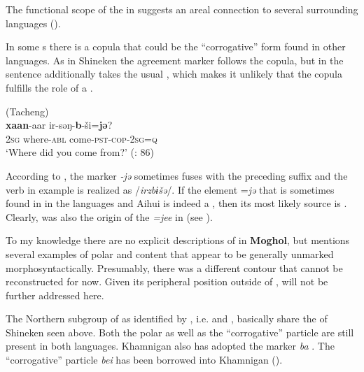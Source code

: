 \noindent The functional scope of the  in  suggests an areal connection to several surrounding languages ().

In some s there is a copula that could be the “corrogative” form found in other  languages. As in Shineken  the agreement marker follows the copula, but in  the sentence additionally takes the usual , which makes it unlikely that the copula fulfills the role of a .

\ea%
    \label{ex:mong:12}
     (Tacheng)\\
     \textbf{{xaan}}-aar  ir-səŋ-\textbf{{b}}{-ši=}\textbf{{jə}}?\\
    2\textsc{sg}  where-\textsc{abl}  come-\textsc{pst}-\textsc{cop}-2\textsc{sg=q}\\
    \glt ‘Where did you come from?’ (\citealt{Yu2008}: 86)
    \z

\noindent According to \citet[79]{Yu2008}, the marker \textit{-jə} sometimes fuses with the preceding suffix and the verb in example  is realized as /\textit{irzbɨšə}/. If the element =\textit{jə} that is sometimes found in  in the  languages  and Aihui  is indeed a , then its most likely source is . Clearly,  was also the origin of the  \textit{=jee} in  (see  ).

To my knowledge there are no explicit descriptions of  in \textbf{Moghol}, but \citet{Weiers1972} mentions several examples of polar and content  that appear to be generally unmarked morphosyntactically. Presumably, there was a different  contour that cannot be reconstructed for now. Given its peripheral position outside of ,  will not be further addressed here.

The Northern subgroup of  as identified by \citet{Rybatzki2003b}, i.e.  and , basically share the  of Shineken  seen above. Both the polar  as well as the “corrogative” particle are still present in both languages. Khamnigan also has adopted the  marker \textit{ba} . The  “corrogative” particle \textit{bei} has been borrowed into Khamnigan  ().

